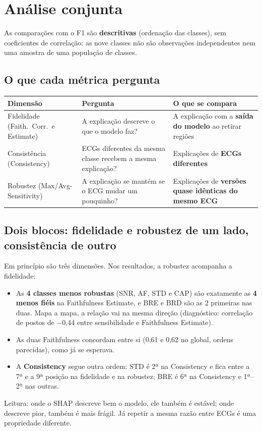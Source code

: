 \documentclass[11pt,a4paper]{article}
\begin{document}
\section{Análise conjunta}
As comparações com o F1 são \textbf{descritivas} (ordenação das classes), sem coeficientes de correlação: as nove classes não são observações independentes nem uma amostra de uma população de classes.

\subsection{O que cada métrica pergunta}
\begin{table}[H]
\centering
\small
\begin{tabularx}{\textwidth}{lXX}
\toprule
\textbf{Dimensão} & \textbf{Pergunta} & \textbf{O que se compara} \\
\midrule
Fidelidade (Faith.\ Corr.\ e Estimate) & A explicação descreve o que o modelo faz? & A explicação com a \textbf{saída do modelo} ao retirar regiões \\
Consistência (Consistency) & ECGs diferentes da mesma classe recebem a mesma explicação? & Explicações de \textbf{ECGs diferentes} \\
Robustez (Max/Avg-Sensitivity) & A explicação se mantém se o ECG mudar um pouquinho? & Explicações de \textbf{versões quase idênticas do mesmo ECG} \\
\bottomrule
\end{tabularx}
\end{table}

\subsection{Dois blocos: fidelidade e robustez de um lado, consistência de outro}
Em princípio são três dimensões. Nos resultados, a robustez acompanha a fidelidade:
\begin{itemize}
    \item As \textbf{4 classes menos robustas} (SNR, AF, STD e CAP) são exatamente as \textbf{4 menos fiéis} na Faithfulness Estimate, e BRE e BRD são as 2 primeiras nas duas. Mapa a mapa, a relação vai na mesma direção (diagnóstico: correlação de postos de $-$0,44 entre sensibilidade e Faithfulness Estimate).
    \item As duas Faithfulness concordam entre si (0,61 e 0,62 no global, ordens parecidas), como já se esperava.
    \item A \textbf{Consistency} segue outra ordem: STD é 2ª na Consistency e fica entre a 7ª e a 9ª posição na fidelidade e na robustez; BRE é 6ª na Consistency e 1ª–2ª nas outras.
\end{itemize}
Leitura: onde o SHAP descreve bem o modelo, ele também é estável; onde descreve pior, também é mais frágil. Já repetir a mesma razão entre ECGs é uma propriedade diferente.
\end{document}
